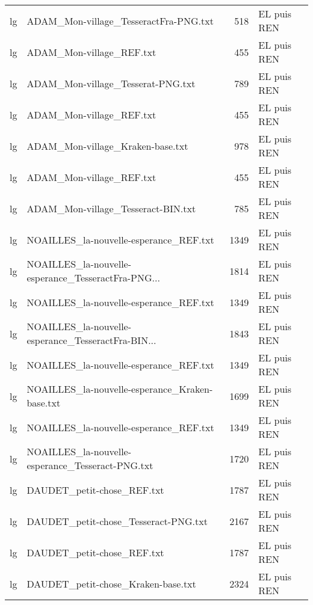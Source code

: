 \begin{tabular}{llrl}
    lg &              ADAM\_Mon-village\_TesseractFra-PNG.txt &                   518 & EL puis REN \\
    lg &                           ADAM\_Mon-village\_REF.txt &                   455 & EL puis REN \\
    lg &                  ADAM\_Mon-village\_Tesserat-PNG.txt &                   789 & EL puis REN \\
    lg &                           ADAM\_Mon-village\_REF.txt &                   455 & EL puis REN \\
    lg &                   ADAM\_Mon-village\_Kraken-base.txt &                   978 & EL puis REN \\
    lg &                           ADAM\_Mon-village\_REF.txt &                   455 & EL puis REN \\
    lg &                 ADAM\_Mon-village\_Tesseract-BIN.txt &                   785 & EL puis REN \\
    lg &             NOAILLES\_la-nouvelle-esperance\_REF.txt &                  1349 & EL puis REN \\
    lg & NOAILLES\_la-nouvelle-esperance\_TesseractFra-PNG... &                  1814 & EL puis REN \\
    lg &             NOAILLES\_la-nouvelle-esperance\_REF.txt &                  1349 & EL puis REN \\
    lg & NOAILLES\_la-nouvelle-esperance\_TesseractFra-BIN... &                  1843 & EL puis REN \\
    lg &             NOAILLES\_la-nouvelle-esperance\_REF.txt &                  1349 & EL puis REN \\
    lg &     NOAILLES\_la-nouvelle-esperance\_Kraken-base.txt &                  1699 & EL puis REN \\
    lg &             NOAILLES\_la-nouvelle-esperance\_REF.txt &                  1349 & EL puis REN \\
    lg &   NOAILLES\_la-nouvelle-esperance\_Tesseract-PNG.txt &                  1720 & EL puis REN \\
    lg &                         DAUDET\_petit-chose\_REF.txt &                  1787 & EL puis REN \\
    lg &               DAUDET\_petit-chose\_Tesseract-PNG.txt &                  2167 & EL puis REN \\
    lg &                         DAUDET\_petit-chose\_REF.txt &                  1787 & EL puis REN \\
    lg &                 DAUDET\_petit-chose\_Kraken-base.txt &                  2324 & EL puis REN \\

\end{tabular}
